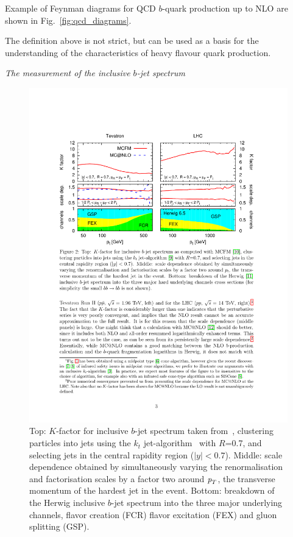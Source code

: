Example of Feynman diagrams for QCD $b$-quark production up to NLO are shown in Fig.~\ref{fig:qcd_diagrams}.

The definition above is not strict, but can be used as a basis for the understanding of the characteristics of heavy flavour quark production.



{\em The measurement of the inclusive $b$-jet spectrum}


\begin{figure}[tp]
\centering
\includegraphics[height=0.7\textwidth,viewport=300 410 530 690,clip]{FIGS/bjets_qcd.pdf}
  \caption{Top: $K$-factor for inclusive $b$-jet spectrum taken
  from~\cite{Salam.AccurateHQ}, clustering particles into jets using the $k_t$
  jet-algorithm~\cite{kt1}  with $R$=0.7, and selecting jets in the central
  rapidity region ($|y| <0.7$). Middle: scale dependence obtained by
  simultaneously varying the renormalisation and factorisation scales by a factor
  two around ${\emph{p}_{T}}$, the transverse momentum of the hardest jet in the event.
  Bottom: breakdown of the Herwig \cite{Herwig} inclusive $b$-jet spectrum into
  the three major underlying channels, flavor creation (FCR) flavor excitation
  (FEX) and gluon splitting (GSP).}
  \label{fig:bjets_qcd}
\end{figure}




